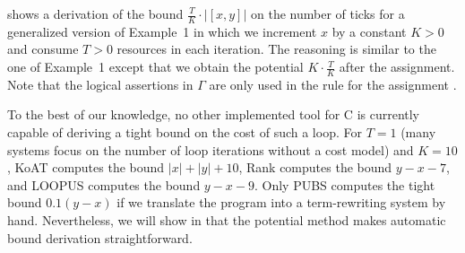 \documentclass[nocopyrightspace,preprint,pldi]{sigplanconf-pldi15}
\newcommand{\iffull}[2]{\ifx\fullversion\undefined{#2}\else{#1}\fi}
\newcommand{\pref}[1]{\prettyref{#1}}
\begin{document}
\pref{fig:ex1} shows a derivation of the bound
$\frac{T}{K}{\cdot}|[x,y]|$ on the number of ticks for a generalized
version of Example~1 in which we increment $x$ by a constant $K>0$ and
consume $T>0$ resources in each iteration.  The reasoning is similar
to the one of Example~1 except that we obtain the potential
$K{\cdot}\frac{T}{K}$ after the assignment.  Note that the logical
assertions in $\Gamma$ are only used in the rule for the assignment
.

To the best of our knowledge, no other implemented tool for C is
currently capable of deriving a tight bound on the cost of such a
loop.  For $T=1$ (many systems focus on the number of loop iterations
without a cost model) and $K=10$, KoAT computes the bound $|x| + |y| +
10$, Rank computes the bound $y-x-7$, and LOOPUS computes the bound
$y-x-9$.  Only PUBS computes the tight bound $0.1(y-x)$ if we
translate the program into a term-rewriting system by
hand. Nevertheless, we will show in \pref{sec:AAA} that the
potential method makes automatic bound derivation straightforward.


\end{document}
